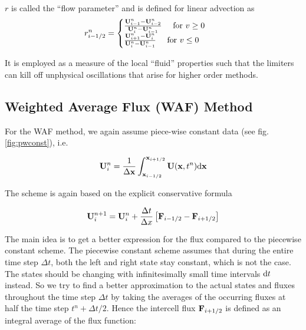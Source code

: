 $r$ is called the ``flow parameter'' and is defined for linear advection as
\begin{align*}
	r^n_{i-1/2} &= \begin{cases}
		\frac{\mathbf{U}_{i-1}^n - \mathbf{U}_{i-2}^n}{\mathbf{U}_{i}^n - \mathbf{U}_{i-1}^n} 	\quad \text{ for } v  \geq 0 \\
		\frac{\mathbf{U}_{i+1}^n - \mathbf{U}_{i}^n}{\mathbf{U}_{i}^n - \mathbf{U}_{i-1}^n} 	\quad \text{ for } v  \leq 0 \\
	\end{cases}
\end{align*}

It is employed as a measure of the local ``fluid'' properties such that the limiters can kill off unphysical oscillations that arise for higher order methods.















\subsection{Weighted Average Flux (WAF) Method}\label{chap:advection-waf}



For the WAF method, we again assume piece-wise constant data (see fig. \ref{fig:pwconst}), i.e.

\begin{equation}
	\mathbf{U}_i ^ n = \frac{1}{\Delta \mathbf{x}} \int_{\mathbf{x}_{i-1/2}}^{\mathbf{x}_{i+1/2}} \mathbf{U}(\mathbf{x}, t^n) \mathrm{d} \mathbf{x}
\end{equation}

The scheme is again based on the explicit conservative formula

\begin{equation}
	\mathbf{U}_{i}^{n+1} = \mathbf{U}_i^n + \frac{\Delta t}{\Delta x} \left[ \mathbf{F}_{i - 1/2} - \mathbf{F}_{i + 1/2} \right] \label{eq:advection_basics_waf}
\end{equation}

The main idea is to get a better expression for the flux compared to the piecewise constant scheme.
The piecewise constant scheme assumes that during the entire time step $\Delta t$, both the left and right state stay constant, which is not the case.
The states should be changing with infinitesimally small time intervals $\mathrm{d} t$ instead.
So we try to find a better approximation to the actual states and fluxes throughout the time step $\Delta t$ by taking the averages of the occurring fluxes at half the time step $t^n + \Delta t / 2$.
Hence the intercell flux $\mathbf{F}_{i + 1/2}$ is defined as an integral average of the flux function:

